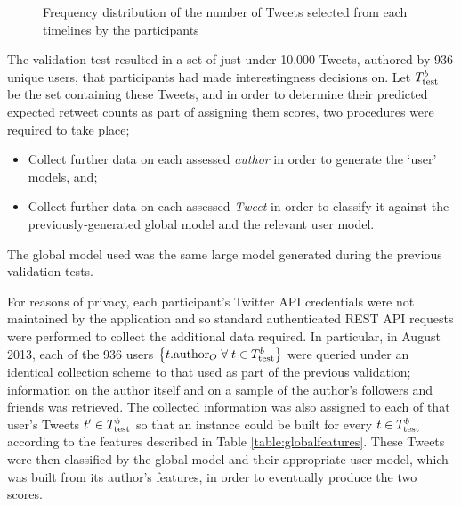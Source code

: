 \begin{figure}[h]
\centering
{}
\caption{Frequency distribution of the number of Tweets selected from each timelines by the participants}
\label{fig:num_tweets_selected}
\end{figure}

The validation test resulted in a set of just under 10,000 Tweets, authored by 936 unique users, that participants had made interestingness decisions on. Let $T^b_{\textrm{test}}{}$ be the set containing these Tweets, and in order to determine their predicted expected retweet counts as part of assigning them scores, two procedures were required to take place;
\begin{itemize}
    \item Collect further data on each assessed \textit{author} in order to generate the `user' models, and;
    \item Collect further data on each assessed \textit{Tweet} in order to classify it against the previously-generated global model and the relevant user model.
\end{itemize}
The global model used was the same large model generated during the previous validation tests.

For reasons of privacy, each participant's Twitter API credentials were not maintained by the application and so standard authenticated REST API requests were performed to collect the additional data required. In particular, in August 2013, each of the 936 users  $\left\{ t.\textrm{author}_O \; \forall \; t \in T^b_{\textrm{test}}{} \right\}$ were queried under an identical collection scheme to that used as part of the previous validation; information on the author itself and on a sample of the author's followers and friends was retrieved. The collected information was also assigned to each of that user's Tweets $t' \in T^b_{\textrm{test}}{}$ so that an instance could be built for every $t \in T^b_{\textrm{test}}{}$ according to the features described in Table \ref{table:globalfeatures}. These Tweets were then classified by the global model and their appropriate user model, which was built from its author's features, in order to eventually produce the two scores. 

